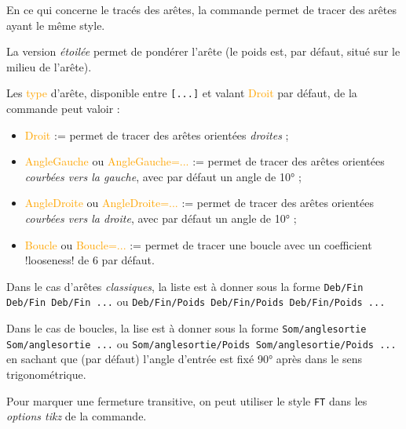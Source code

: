 \documentclass[french,a4paper,11pt]{article}
\newcommand\Cle[1]{{\small\sffamily\textlangle \textcolor{orange}{#1}\textrangle}}
\begin{document}
\begin{tipblock}
En ce qui concerne le tracés des arêtes, la commande permet de tracer des arêtes ayant le même style.

\smallskip

La version \textit{étoilée} permet de pondérer l'arête (le poids est, par défaut, situé sur le milieu de l'arête).

\smallskip

Les \Cle{type} d'arête, disponible entre \texttt{[...]} et valant \Cle{Droit} par défaut, de la commande peut valoir :

\begin{itemize}
	\item \Cle{Droit} := permet de tracer des arêtes orientées \textit{droites} ;
	\item \Cle{AngleGauche} ou \Cle{AngleGauche=...} := permet de tracer des arêtes orientées \textit{courbées vers la gauche}, avec par défaut un angle de 10° ;
	\item \Cle{AngleDroite} ou \Cle{AngleDroite=...} := permet de tracer des arêtes orientées \textit{courbées vers la droite}, avec par défaut un angle de 10° ;
	\item \Cle{Boucle} ou \Cle{Boucle=...} := permet de tracer une boucle avec un coefficient \motcletex!looseness! de 6 par défaut.
\end{itemize}

Dans le cas d'arêtes \textit{classiques}, la liste est à donner sous la forme \verb|Deb/Fin Deb/Fin Deb/Fin ...| ou \verb|Deb/Fin/Poids Deb/Fin/Poids Deb/Fin/Poids ...|

\smallskip

Dans le cas de boucles, la lise est à donner sous la forme \verb|Som/anglesortie Som/anglesortie ...| ou \verb|Som/anglesortie/Poids Som/anglesortie/Poids ...| en sachant que (par défaut) l'angle d'entrée est fixé 90° après dans le sens trigonométrique.

\smallskip

Pour marquer une fermeture transitive, on peut utiliser le style \verb|FT| dans les \textit{options tikz} de la commande.
\end{tipblock}

\begin{DemoCode}[]
\begin{GrapheTikz}
\end{GrapheTikz}
\hspace{5mm}
\begin{GrapheTikz}
\end{GrapheTikz}
\hspace{5mm}
\begin{GrapheTikz}
\end{GrapheTikz}
\end{DemoCode}
\end{document}
